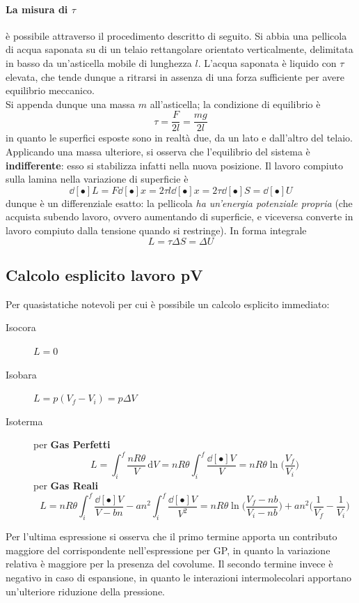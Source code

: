 \documentclass[10pt, oneside]{book}
\newcommand{\integral}[4]{\int_{#1}^{#2} #3 \, \mathrm{d}#4}
\begin{document}
\paragraph{La misura di $\tau$} è possibile attraverso il procedimento descritto di seguito. Si abbia una pellicola di acqua saponata su di un telaio rettangolare orientato verticalmente, delimitata in basso da un'asticella mobile di lunghezza $l$.
L'acqua saponata è liquido con $\tau$ elevata, che tende dunque a ritrarsi in assenza di una forza sufficiente per avere equilibrio meccanico.\\
Si appenda dunque una massa $m$ all'asticella; la condizione di equilibrio è
\[\tau = \frac{F}{2l} = \frac{mg}{2l}\]
in quanto le superfici esposte sono in realtà due, da un lato e dall'altro del telaio.\\
Applicando una massa ulteriore, si osserva che l'equilibrio del sistema è \textbf{indifferente}: esso si stabilizza infatti nella nuova posizione. Il lavoro compiuto sulla lamina nella variazione di superficie è 
\[\dd[•]{L} = F \dd[•]{x} = 2 \tau l \dd[•]{x} = 2 \tau \dd[•]{S} = \dd[•]{U}\]
dunque è un differenziale esatto: la pellicola \textit{ha un'energia potenziale propria} (che acquista subendo lavoro, ovvero aumentando di superficie, e viceversa converte in lavoro compiuto dalla tensione quando si restringe). In forma integrale
\[L = \tau \Delta S = \Delta U\]

\subsection{Calcolo esplicito lavoro pV}
Per quasistatiche notevoli per cui è possibile un calcolo esplicito immediato:
\begin{description}
\item[Isocora] $\displaystyle L = 0$
\item[Isobara] $\displaystyle L = p(V_f - V_i) = p \Delta V$
\item[Isoterma] per \textbf{Gas Perfetti} \[ L = \integral{i}{f}{\frac{nR \theta}{V}}{V} = nR \theta \int_i^f \frac{\dd[•]{V}}{V} = nR \theta \ln \big(\frac{V_f}{V_i}\big)\] 
per \textbf{Gas Reali} \[ L = n R \theta \int_i^f \frac{\dd[•]{V}}{V - bn} - a n^2 \int_i^f \frac{\dd[•]{V}}{V^2} =  nR\theta \ln \bigg(\frac{V_f - nb}{V_i - nb}\bigg) + an^2 \big(\frac{1}{V_f} - \frac{1}{V_i}\big)\]
\end{description}
Per l'ultima espressione si osserva che il primo termine apporta un contributo maggiore del corrispondente nell'espressione per GP, in quanto la variazione relativa è maggiore per la presenza del covolume. Il secondo termine invece è negativo in caso di espansione, in quanto le interazioni intermolecolari apportano un'ulteriore riduzione della pressione.
\end{document}
